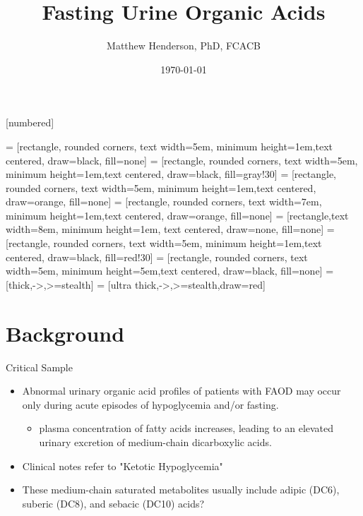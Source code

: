 \documentclass[presentation, smaller]{beamer}
\author{Matthew Henderson, PhD, FCACB}
\date{\today}
\title{Fasting Urine Organic Acids}
\institute[NSO]{Newborn Screening Ontario}
\begin{document}
\maketitle


\vspace{220pt}
\beamertemplatenavigationsymbolsempty
{}[numbered]


 = [rectangle, rounded corners, text width=5em, minimum height=1em,text centered, draw=black, fill=none]
 = [rectangle, rounded corners, text width=5em, minimum height=1em,text centered, draw=black, fill=gray!30]
 = [rectangle, rounded corners, text width=5em, minimum height=1em,text centered, draw=orange, fill=none]
 = [rectangle, rounded corners, text width=7em, minimum height=1em,text centered, draw=orange, fill=none]
 = [rectangle,text width=8em, minimum height=1em, text centered, draw=none, fill=none]
 = [rectangle, rounded corners, text width=5em, minimum height=1em,text centered, draw=black, fill=red!30]
 = [rectangle, rounded corners, text width=5em, minimum height=5em,text centered, draw=black, fill=none]
 = [thick,->,>=stealth]
 = [ultra thick,->,>=stealth,draw=red]

\section{Background}
\label{sec:orgheadline10}
\begin{frame}[label={sec:orgheadline1}]{Critical Sample}
\begin{itemize}
\item Abnormal urinary organic acid profiles of patients with FAOD may
occur only during acute episodes of hypoglycemia and/or fasting.

\begin{itemize}
\item plasma concentration of fatty acids increases, leading to an
elevated urinary excretion of medium-chain dicarboxylic acids.
\end{itemize}

\item Clinical notes refer to "Ketotic Hypoglycemia"

\item These medium-chain saturated metabolites usually include adipic
(DC6), suberic (DC8), and sebacic (DC10) acids?
\end{itemize}
\end{frame}
\end{document}
